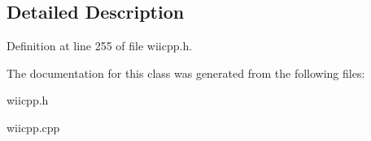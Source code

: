 \subsection{\-Detailed \-Description}


\-Definition at line 255 of file wiicpp.\-h.



\-The documentation for this class was generated from the following files\-:\begin{DoxyCompactItemize}
\item 
wiicpp.\-h\item 
wiicpp.\-cpp\end{DoxyCompactItemize}
